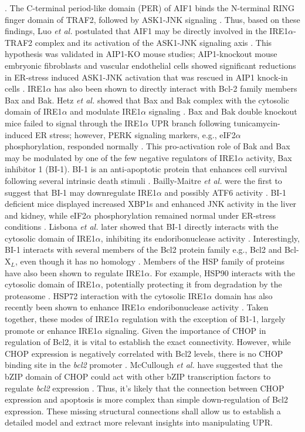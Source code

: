 \documentclass[fleqn,10pt]{wlscirep}
\begin{document}
\cite{Luo:2008ly}. The C-terminal period-like domain (PER) of AIF1 binds the N-terminal RING finger domain of TRAF2, followed by ASK1-JNK signaling \cite{Zhang:2004ve}. Thus, based on these findings, Luo \emph{et al.} postulated that AIF1 may be directly involved in the IRE1$\alpha$-TRAF2 complex and its activation of the ASK1-JNK signaling axis \cite{Luo:2008ly}. This hypothesis was validated in AIP1-KO mouse studies; AIP1-knockout mouse embryonic fibroblasts and vascular endothelial cells showed significant reductions in ER-stress induced ASK1-JNK activation that was rescued in AIP1 knock-in cells \cite{Luo:2008ly}. IRE1$\alpha$ has also been shown to directly interact with Bcl-2 family members Bax and Bak. Hetz \emph{et al.} showed that Bax and Bak complex with the cytosolic domain of IRE1$\alpha$ and modulate IRE1$\alpha$ signaling \cite{Hetz:2006qf}. Bax and Bak double knockout mice failed to signal through the IRE1$\alpha$ UPR branch following tunicamycin-induced ER stress; however, PERK signaling markers, e.g., eIF2$\alpha$ phosphorylation, responded normally \cite{Hetz:2006qf}. This pro-activation role of Bak and Bax may be modulated by one of the few negative regulators of IRE1$\alpha$ activity, Bax inhibitor 1 (BI-1). BI-1 is an anti-apoptotic protein that enhances cell survival following several intrinsic death stimuli \cite{Xu:1998dq}. Bailly-Maitre \emph{et al.} were the first to suggest that BI-1 may downregulate IRE1$\alpha$ and possibly ATF6 activity \cite{Bailly-Maitre:2006bh}. BI-1 deficient mice displayed increased XBP1s and enhanced JNK activity in the liver and kidney, while eIF2$\alpha$ phosphorylation remained normal under ER-stress conditions \cite{Bailly-Maitre:2006bh}. Lisbona \emph{et al.} later showed that BI-1 directly interacts with the cytosolic domain of IRE1$\alpha$, inhibiting its endoribonuclease activity \cite{Lisbona:2009cr}. Interestingly, BI-1 interacts with several members of the Bcl2 protein family e.g., Bcl2 and Bcl-X$_{L}$, even though it has no homology \cite{Xu:1998dq}. Members of the HSP family of proteins have also been shown to regulate IRE1$\alpha$. For example, HSP90 interacts with the cytosolic domain of IRE1$\alpha$, potentially protecting it from degradation by the proteasome \cite{Marcu:2002oq}. HSP72 interaction with the cytosolic IRE1$\alpha$ domain has also recently been shown to enhance IRE1$\alpha$ endoribonuclease activity \cite{Gupta:2010kl}. Taken together, these modes of IRE1$\alpha$ regulation with the exception of B1-1, largely promote or enhance IRE1$\alpha$ signaling. Given the importance of CHOP in regulation of Bcl2, it is vital to establish the exact connectivity. However, while CHOP expression is negatively correlated with Bcl2 levels, there is no CHOP binding site in the \emph{bcl2} promoter \cite{mccullough2001gsc}. McCullough \emph{et al.} have suggested that the bZIP domain of CHOP could act with other bZIP transcription factors to regulate \emph{bcl2} expression \cite{mccullough2001gsc}. Thus, it's likely that the connection between CHOP expression and apoptosis is more complex than simple down-regulation of Bcl2 expression. These missing structural connections shall allow us to establish a detailed model and extract more relevant insights into manipulating UPR.
\end{document}
